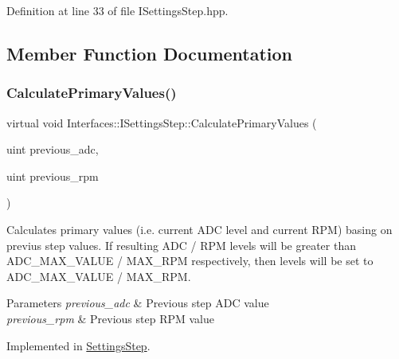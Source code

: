 Definition at line 33 of file I\+Settings\+Step.\+hpp.



\subsection{Member Function Documentation}
\mbox{\label{class_interfaces_1_1_i_settings_step_a04e46c3ebe1f28e0ad0bce23fb863f66}} 
\subsubsection{\texorpdfstring{Calculate\+Primary\+Values()}{CalculatePrimaryValues()}}
{\footnotesize\ttfamily virtual void Interfaces\+::\+I\+Settings\+Step\+::\+Calculate\+Primary\+Values (\begin{DoxyParamCaption}\item[{uint}]{previous\+\_\+adc,  }\item[{uint}]{previous\+\_\+rpm }\end{DoxyParamCaption})\hspace{0.3cm}{\ttfamily [pure virtual]}}



Calculates primary values (i.\+e. current A\+DC level and current R\+PM) basing on previus step values. If resulting A\+DC / R\+PM levels will be greater than A\+D\+C\+\_\+\+M\+A\+X\+\_\+\+V\+A\+L\+UE / M\+A\+X\+\_\+\+R\+PM respectively, then levels will be set to A\+D\+C\+\_\+\+M\+A\+X\+\_\+\+V\+A\+L\+UE / M\+A\+X\+\_\+\+R\+PM. 


\begin{DoxyParams}{Parameters}
{\em previous\+\_\+adc} & Previous step A\+DC value \\
\hline
{\em previous\+\_\+rpm} & Previous step R\+PM value \\
\hline
\end{DoxyParams}


Implemented in \hyperlink{class_settings_step_ac6f79a139ab25cc50ed105f64fc9652f}{Settings\+Step}.

\mbox{\label{class_interfaces_1_1_i_settings_step_ab77c6eaa45707ec4932a8f432b13ad78}} 
